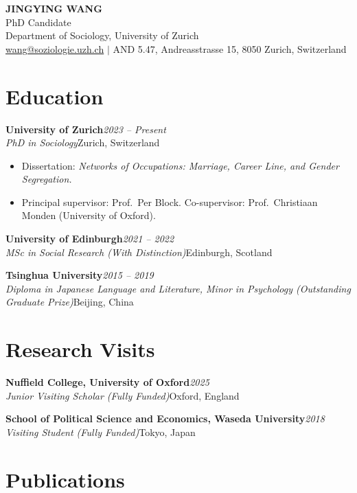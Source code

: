 \documentclass[11pt,a4paper]{article}
\newcommand{\entry}[4]{%
    \noindent\textbf{#1}\hfill\textit{\color{lighttext}#2}\\
    \textit{\color{lighttext}#3}\hfill{\color{lighttext}#4}\par\vspace{0.05em}
}
\begin{document}
\begin{center}
    {\LARGE\bfseries\color{accent} JINGYING WANG}\\[0.3em]
    {\color{lighttext} PhD Candidate}\\
    {\color{lighttext} Department of Sociology, University of Zurich}\\[0.3em]
    {\small\color{lighttext}
        \href{mailto:wang@soziologie.uzh.ch}{wang@soziologie.uzh.ch}
        \enspace$\vert$\enspace
        AND 5.47, Andreasstrasse 15, 8050 Zurich, Switzerland
    }
\end{center}

\section{Education}

\entry{University of Zurich}{2023 -- Present}
      {PhD in Sociology}{Zurich, Switzerland}
\begin{itemize}
    \item Dissertation: \textit{Networks of Occupations: Marriage, Career Line, and Gender Segregation.}
    \item Principal supervisor: Prof.\ Per Block. Co-supervisor: Prof.\ Christiaan Monden (University of Oxford).
\end{itemize}

\vspace{0.3em}
\entry{University of Edinburgh}{2021 -- 2022}
      {MSc in Social Research (With Distinction)}{Edinburgh, Scotland}

\vspace{0.3em}
\entry{Tsinghua University}{2015 -- 2019}
      {Diploma in Japanese Language and Literature, Minor in Psychology (Outstanding Graduate Prize)}{Beijing, China}

\section{Research Visits}

\entry{Nuffield College, University of Oxford}{2025}
      {Junior Visiting Scholar (Fully Funded)}{Oxford, England}

\vspace{0.3em}
\entry{School of Political Science and Economics, Waseda University}{2018}
      {Visiting Student (Fully Funded)}{Tokyo, Japan}

\section{Publications}
\end{document}
